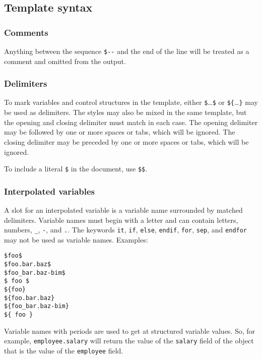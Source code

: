 \documentclass[
  a4paper,
]{article}
\begin{document}
\hypertarget{template-syntax}{%
\subsection{Template syntax}\label{template-syntax}}

\hypertarget{comments}{%
\subsubsection{Comments}\label{comments}}

Anything between the sequence \texttt{\$-\/-} and the end of the line
will be treated as a comment and omitted from the output.

\hypertarget{delimiters}{%
\subsubsection{Delimiters}\label{delimiters}}

To mark variables and control structures in the template, either
\texttt{\$}\ldots{}\texttt{\$} or \texttt{\$\{}\ldots{}\texttt{\}} may
be used as delimiters. The styles may also be mixed in the same
template, but the opening and closing delimiter must match in each case.
The opening delimiter may be followed by one or more spaces or tabs,
which will be ignored. The closing delimiter may be preceded by one or
more spaces or tabs, which will be ignored.

To include a literal \texttt{\$} in the document, use \texttt{\$\$}.

\hypertarget{interpolated-variables}{%
\subsubsection{Interpolated variables}\label{interpolated-variables}}

A slot for an interpolated variable is a variable name surrounded by
matched delimiters. Variable names must begin with a letter and can
contain letters, numbers, \texttt{\_}, \texttt{-}, and \texttt{.}. The
keywords \texttt{it}, \texttt{if}, \texttt{else}, \texttt{endif},
\texttt{for}, \texttt{sep}, and \texttt{endfor} may not be used as
variable names. Examples:

\begin{verbatim}
$foo$
$foo.bar.baz$
$foo_bar.baz-bim$
$ foo $
${foo}
${foo.bar.baz}
${foo_bar.baz-bim}
${ foo }
\end{verbatim}

Variable names with periods are used to get at structured variable
values. So, for example, \texttt{employee.salary} will return the value
of the \texttt{salary} field of the object that is the value of the
\texttt{employee} field.
\end{document}
